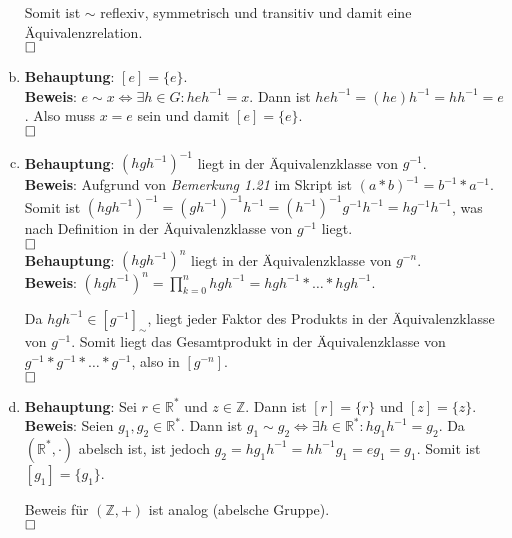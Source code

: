 \documentclass[12pt,a4paper]{article}
\newcommand{\qed}{\null\nobreak\hfill\square}
\begin{document}
\begin{enumerate}[(a)]
    Somit ist $\sim$ reflexiv, symmetrisch und transitiv und damit eine Äquivalenzrelation.\\
    $\qed$

    \item \textbf{Behauptung}: $[e] = \{e\}$.\\

    \textbf{Beweis}: $e \sim x \Leftrightarrow \exists h \in G: heh^{-1} = x$.
    Dann ist $heh^{-1} = (he)h^{-1} = hh^{-1} = e$.
    Also muss $x=e$ sein und damit $[e] = \{e\}$.\\
    $\qed$

    \item \textbf{Behauptung}: $(hgh^{-1})^{-1}$ liegt in der Äquivalenzklasse von $g^{-1}$.\\

    \textbf{Beweis}: Aufgrund von \textit{Bemerkung 1.21} im Skript ist $(a * b)^{-1} = b^{-1} * a^{-1}$.
    Somit ist $(hgh^{-1})^{-1} = (gh^{-1})^{-1}h^{-1} = (h^{-1})^{-1}g^{-1}h^{-1} = hg^{-1}h^{-1}$, was nach Definition in der Äquivalenzklasse von $g^{-1}$ liegt.\\
    $\qed$\\

    \textbf{Behauptung}: $(hgh^{-1})^n$ liegt in der Äquivalenzklasse von $g^{-n}$.\\

    \textbf{Beweis}: $(hgh^{-1})^n = \prod\limits_{k=0}^n hgh^{-1} = hgh^{-1} * \dots * hgh^{-1}.$

    Da $hgh^{-1} \in [g^{-1}]_\sim$, liegt jeder Faktor des Produkts in der Äquivalenzklasse von $g^{-1}$.
    Somit liegt das Gesamtprodukt in der Äquivalenzklasse von $g^{-1} * g^{-1} * \dots * g^{-1}$, also in $[g^{-n}]$.\\
    $\qed$

    \item \textbf{Behauptung}: Sei $r \in \mathbb{R}^*$ und $z \in \mathbb{Z}$. Dann ist $[r] = \{r\}$ und $[z] = \{z\}$.\\

    \textbf{Beweis}: Seien $g_1, g_2 \in \mathbb{R}^*$.
    Dann ist $g_1 \sim g_2 \Leftrightarrow \exists h \in \mathbb{R}^*: hg_1h^{-1} = g_2$.
    Da $(\mathbb{R}^*, \cdot)$ abelsch ist, ist jedoch
    $g_2 = hg_1h^{-1} = hh^{-1}g_1 = eg_1 = g_1$.
    Somit ist $[g_1] = \{g_1\}$.

    Beweis für $(\mathbb{Z}, +)$ ist analog (abelsche Gruppe).\\
    $\qed$
\end{enumerate}
\end{document}
